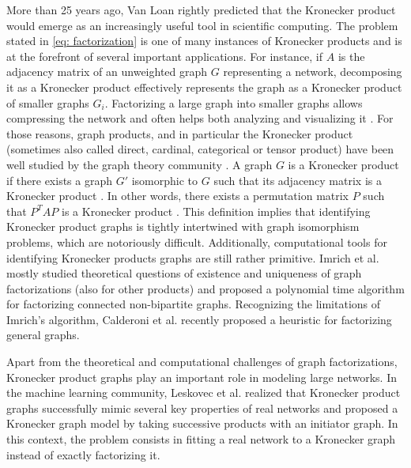 \documentclass{article}
\numberwithin{equation}{section}
\theoremstyle{definition}
\begin{document}
More than 25 years ago, Van Loan \cite{van2000ubiquitous} rightly predicted that the Kronecker product would emerge as an increasingly useful tool in scientific computing. The problem stated in \eqref{eq: factorization} is one of many instances of Kronecker products and is at the forefront of several important applications. For instance, if $A$ is the adjacency matrix of an unweighted graph $G$ representing a network, decomposing it as a Kronecker product effectively represents the graph as a Kronecker product of smaller graphs $G_i$. Factorizing a large graph into smaller graphs allows compressing the network and often helps both analyzing and visualizing it \cite{leskovec2007scalable,leskovec2010kronecker,kepner2011graph}. For those reasons, graph products, and in particular the Kronecker product (sometimes also called direct, cardinal, categorical or tensor product) have been well studied by the graph theory community \cite{imrich1998factoring,hammack2011handbook}. A graph $G$ is a Kronecker product if there exists a graph $G'$ isomorphic to $G$ such that its adjacency matrix is a Kronecker product \cite{weichsel1962kronecker}. In other words, there exists a permutation matrix $P$ such that $P^TAP$ is a Kronecker product \cite{calderoni2021direct}. This definition implies that identifying Kronecker product graphs is tightly intertwined with graph isomorphism problems, which are notoriously difficult. Additionally, computational tools for identifying Kronecker products graphs are still rather primitive. Imrich et al. \cite{imrich1998factoring} mostly studied theoretical questions of existence and uniqueness of graph factorizations (also for other products) and proposed a polynomial time algorithm for factorizing connected non-bipartite graphs. Recognizing the limitations of Imrich's algorithm, Calderoni et al. \cite{calderoni2023heuristic} recently proposed a heuristic for factorizing general graphs. 

Apart from the theoretical and computational challenges of graph factorizations, Kronecker product graphs play an important role in modeling large networks. In the machine learning community, Leskovec et al. \cite{leskovec2007scalable,leskovec2010kronecker} realized that Kronecker product graphs successfully mimic several key properties of real networks and proposed a Kronecker graph model by taking successive products with an initiator graph. In this context, the problem consists in fitting a real network to a Kronecker graph instead of exactly factorizing it.
\end{document}

